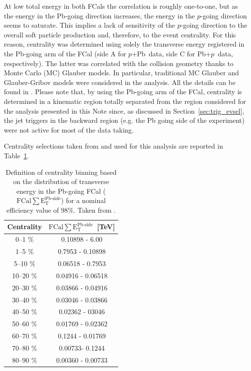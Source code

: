 \documentclass[NOTE, atlasdraft=true, texlive=2020, UKenglish]{atlasdoc}
\newcommand{\ETPB}{$\text{FCal} \sum \text{E}_{\text{T}}^{\text{Pb-side} }$}
\newcommand{\pxPb}{$p$+Pb}
\newcommand{\Pbxp}{Pb+$p$}
\begin{document}
At low total energy in both FCals the correlation is roughly one-to-one, but as the energy in the Pb-going direction increases, the energy in the $p$-going direction seems to saturate. This implies a lack of sensitivity of the $p$-going direction to the overall soft particle production and, therefore, to the event centrality. For this reason, centrality was determined using solely the transverse energy registered in the Pb-going arm of the FCal (side A for \pxPb\ data, side C for \Pbxp\ data, respectively). The latter was correlated with the collision geometry thanks to Monte Carlo (MC) Glauber models. In particular, traditional MC Glauber and Glauber-Gribov models were considered in the analysis. All the details can be found in \cite{Hill:2301540}. Please note that, by using the Pb-going arm of the FCal, centrality is determined in a kinematic region totally separated from the region considered for the analysis presented in this Note since, as discussed in Section~\ref{sec:trig_evsel}, the jet triggers in the backward region (e.g. the Pb going side of the experiment) were not active for most of the data taking. 

Centrality selections taken from \cite{Hill:2301540} and used for this analysis are reported in Table~\ref{tab:cent_bin}.
\begin{table}[!ht]
\centering
\begin{tabular}{ | c | c | }
           \hline
           \rule{0pt}{2.5ex}  
           Centrality   &  \hspace{4mm} \ETPB\ [TeV] \\[0.5ex]
           \hline
           \hline
            0--1 \%      & 0.10898 - 6.00   \\
            \hline 
            1--5 \%      & 0.7953 - 0.10898 \\
            \hline
            5--10 \%     & 0.06518 - 0.7953 \\
            \hline
            10--20 \%    & 0.04916 - 0.06518 \\
            \hline
            20--30 \%    & 0.03866 - 0.04916 \\
            \hline
            30--40 \%    & 0.03046 - 0.03866 \\
            \hline
            40--50 \%    & 0.02362 - 03046 \\
            \hline
            50--60 \%    & 0.01769 - 0.02362 \\
            \hline
            60--70 \%    & 0.1244 - 0.01769 \\
            \hline
            70--80 \%    & 0.00733- 0.1244 \\
            \hline
            80--90 \%    & 0.00360 - 0.00733 \\
            \hline             
        \end{tabular}
        \vspace{2mm}
        \caption{Definition of centrality binning based on  the distribution of transverse energy in the Pb-going FCal (\ETPB) for a nominal efficiency value of 98\%. Taken from \cite{Hill:2301540}.}
        \label{tab:cent_bin}
\end{table}
\end{document}
